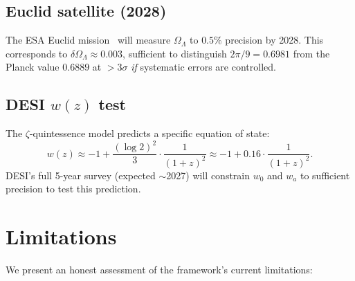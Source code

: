 \documentclass[12pt,a4paper]{article}
\theoremstyle{definition}
\newcommand{\OmL}{\Omega_\Lambda}
\begin{document}
\subsection{Euclid satellite (2028)}

The ESA Euclid mission~\cite{Euclid} will measure $\OmL$ to $0.5\%$ precision
by 2028.  This corresponds to $\delta\OmL\approx 0.003$, sufficient to
distinguish $2\pi/9=0.6981$ from the Planck value $0.6889$ at $>3\sigma$
\emph{if} systematic errors are controlled.

\subsection{DESI $w(z)$ test}

The $\zeta$-quintessence model predicts a specific equation of state:
\[
  w(z)\approx -1+\frac{(\log 2)^2}{3}\cdot\frac{1}{(1+z)^2}
  \approx -1+0.16\cdot\frac{1}{(1+z)^2}.
\]
DESI's full 5-year survey (expected $\sim$2027) will constrain $w_0$ and $w_a$
to sufficient precision to test this prediction.

\section{Limitations}\label{sec:limits}

We present an honest assessment of the framework's current limitations:
\end{document}
